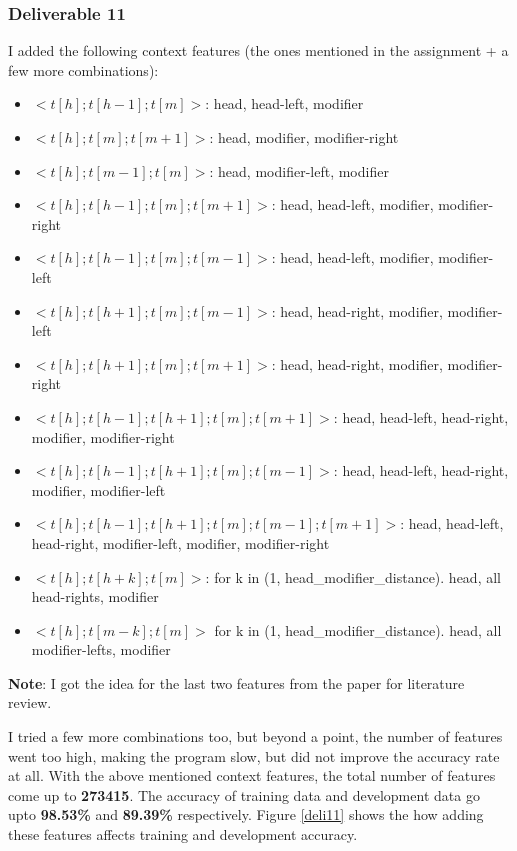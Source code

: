 \documentclass[10pt, letter]{article}
\begin{document}
\subsubsection*{Deliverable 11}
I added the following context features (the ones mentioned in the assignment + a few more combinations):
\begin{itemize}
	\item $<t[h]; t[h - 1]; t[m]>$: head, head-left, modifier
	\item $<t[h]; t[m]; t[m + 1]>$: head, modifier, modifier-right
	\item $<t[h]; t[m - 1]; t[m]>$: head, modifier-left, modifier
	\item $<t[h]; t[h - 1]; t[m]; t[m + 1]>$: head, head-left, modifier, modifier-right
	\item $<t[h]; t[h - 1]; t[m]; t[m - 1]>$: head, head-left, modifier, modifier-left
	\item $<t[h]; t[h + 1]; t[m]; t[m - 1]>$: head, head-right, modifier, modifier-left
	\item $<t[h]; t[h + 1]; t[m]; t[m + 1]>$: head, head-right, modifier, modifier-right
	\item $<t[h]; t[h - 1]; t[h + 1]; t[m]; t[m + 1]>$: head, head-left, head-right, modifier, modifier-right
	\item $<t[h]; t[h - 1]; t[h + 1]; t[m]; t[m - 1]>$: head, head-left, head-right, modifier, modifier-left
	\item $<t[h]; t[h - 1]; t[h + 1]; t[m]; t[m - 1]; t[m + 1]>$: head, head-left, head-right, modifier-left, modifier, modifier-right
	\item $<t[h]; t[h + k] ; t[m]>$: for k in (1, head\_modifier\_distance). head, all head-rights, modifier
	\item $<t[h]; t[m - k] ; t[m]>$ for k in (1, head\_modifier\_distance). head, all modifier-lefts, modifier
\end{itemize}
\textbf{Note}: I got the idea for the last two features from the paper for literature review.

I tried a few more combinations too, but beyond a point, the number of features went too high, making the program slow, but did not improve the accuracy rate at all. With the above mentioned context features, the total number of features come up to \textbf{273415}. The accuracy of training data and development data go upto \textbf{98.53\%} and \textbf{89.39\%} respectively. Figure \ref{deli11} shows the how adding these features affects training and development accuracy.
\end{document}
